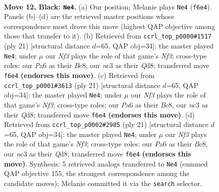 \documentclass[11pt]{article}
\begin{document}
\begin{figure}[p]
\label{fig:thought-m21}
\end{figure}

\clearpage

\begin{figure}[p]\centering
\begin{subfigure}{0.46\textwidth}\centering
\resizebox{\linewidth}{!}{%
\newchessgame
\chessboard[
  setfen={r2qr1k1/1p1bbppp/p1n1pn2/2Pp2B1/3P4/P1N2N1P/1P2BPP1/R2Q1RK1 b - - 0 12},
  showmover=false,
  pgfstyle=straightmove, color=movearrow, markmove={f6-e4}
]}
\caption{}
\end{subfigure}\hfill
\begin{subfigure}{0.46\textwidth}\centering
\resizebox{\linewidth}{!}{%
\newchessgame
\chessboard[
  setfen={r1bqr1k1/1p1nbppp/p1p2n2/3p2B1/3P4/2NBPN1P/PP3PP1/2RQ1RK1 b - - 0 11},
  showmover=false,
  pgfstyle=straightmove, color=movearrow, markmove={f6-e4}
]}
\caption{}
\end{subfigure}
\\[4pt]
\begin{subfigure}{0.46\textwidth}\centering
\resizebox{\linewidth}{!}{%
\newchessgame
\chessboard[
  setfen={r1bqr1k1/1p1nbppp/p1p2n2/3p2B1/3P4/2NBPN1P/PP3PP1/2RQ1RK1 b - - 0 11},
  showmover=false,
  pgfstyle=straightmove, color=movearrow, markmove={f6-e4}
]}
\caption{}
\end{subfigure}\hfill
\begin{subfigure}{0.46\textwidth}\centering
\resizebox{\linewidth}{!}{%
\newchessgame
\chessboard[
  setfen={r1bqr1k1/1p1nbppp/p1p2n2/3p2B1/3P4/2NBPN1P/PP3PP1/2RQ1RK1 b - - 0 11},
  showmover=false,
  pgfstyle=straightmove, color=movearrow, markmove={f6-e4}
]}
\caption{}
\end{subfigure}
\caption{\textbf{Move 12, Black: \texttt{Ne4}.} (a) Our position; Melanie plays \texttt{Ne4} (\texttt{f6e4}). Panels (b)--(d) are the retrieved master positions whose correspondence most drove this move (highest QAP objective among those that transfer to it). (b) Retrieved from \texttt{ccrl\_top\_p0000\#1517} (ply 21) [structural distance $d$=65, QAP obj=34]: the master played \texttt{Ne4}; under $\mu$ our \emph{Nf3} plays the role of that game's \emph{Nf3}; cross-type roles: our \emph{P}a6 as their \emph{B}c8, our \emph{n}c3 as their \emph{Q}d8; transferred move \texttt{f6e4} \textbf{(endorses this move)}. (c) Retrieved from \texttt{ccrl\_top\_p0001\#3613} (ply 21) [structural distance $d$=65, QAP obj=34]: the master played \texttt{Ne4}; under $\mu$ our \emph{Nf3} plays the role of that game's \emph{Nf3}; cross-type roles: our \emph{P}a6 as their \emph{B}c8, our \emph{n}c3 as their \emph{Q}d8; transferred move \texttt{f6e4} \textbf{(endorses this move)}. (d) Retrieved from \texttt{ccrl\_top\_p0002\#2985} (ply 21) [structural distance $d$=65, QAP obj=34]: the master played \texttt{Ne4}; under $\mu$ our \emph{Nf3} plays the role of that game's \emph{Nf3}; cross-type roles: our \emph{P}a6 as their \emph{B}c8, our \emph{n}c3 as their \emph{Q}d8; transferred move \texttt{f6e4} \textbf{(endorses this move)}. Synthesis: 5 retrieved analogs transferred to \texttt{Ne4} (summed QAP objective 155, the strongest correspondence among the candidate moves); Melanie committed it via the \texttt{search} selector.}

\end{figure}
\end{document}
